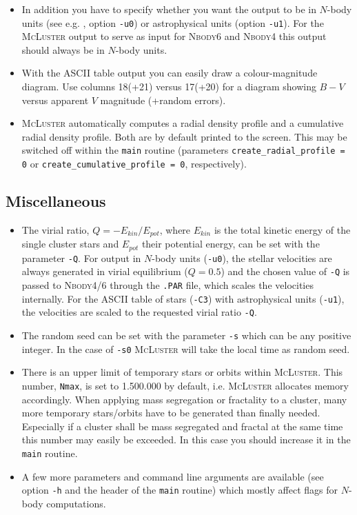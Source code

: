 \documentclass[useAMS,usenatbib]{mn2e}
\begin{document}
\begin{itemize}
\item In addition you have to specify whether you want the output to be in $N$-body units (see e.g. \citealt{Heggie03}, option \texttt{-u0}) or astrophysical units (option \texttt{-u1}). For the \textsc{McLuster} output to serve as input for \textsc{Nbody6} and \textsc{Nbody4} this output should always be in $N$-body units.
\item With the ASCII table output you can easily draw a colour-magnitude diagram. Use columns 18(+21) versus 17(+20) for a diagram showing $B-V$ versus apparent $V$ magnitude (+random errors).
\item \textsc{McLuster} automatically computes a radial density profile and a cumulative radial density profile. Both are by default printed to the screen. This may be switched off within the \texttt{main} routine (parameters \texttt{create\_radial\_profile = 0} or \texttt{create\_cumulative\_profile = 0}, respectively).
\end{itemize}

\subsection*{Miscellaneous}
\begin{itemize}
\item The virial ratio, $Q = -E_{kin}/E_{pot}$, where $E_{kin}$ is the total kinetic energy of the single cluster stars and $E_{pot}$ their potential energy, can be set with the parameter \texttt{-Q}. For output in $N$-body units (\texttt{-u0}), the stellar velocities are always generated in virial equilibrium ($Q=0.5$) and the chosen value of \texttt{-Q} is passed to \textsc{Nbody4/6} through the \texttt{.PAR} file, which scales the velocities internally. For the ASCII table of stars (\texttt{-C3}) with astrophysical units (\texttt{-u1}), the velocities are scaled to the requested virial ratio \texttt{-Q}. 
\item The random seed can be set with the parameter \texttt{-s} which can be any positive integer. In the case of \texttt{-s0} \textsc{McLuster} will take the local time as random seed.
\item There is an upper limit of temporary stars or orbits within \textsc{McLuster}. This number, \texttt{Nmax}, is set to 1.500.000 by default, i.e. \textsc{McLuster} allocates memory accordingly. When applying mass segregation or fractality to a cluster, many more temporary stars/orbits have to be generated than finally needed. Especially if a cluster shall be mass segregated and fractal at the same time this number may easily be exceeded. In this case you should increase it in the \texttt{main} routine. 
\item A few more parameters and command line arguments are available (see option \texttt{-h} and the header of the \texttt{main} routine) which mostly affect flags for $N$-body computations.
\end{itemize}
\end{document}
